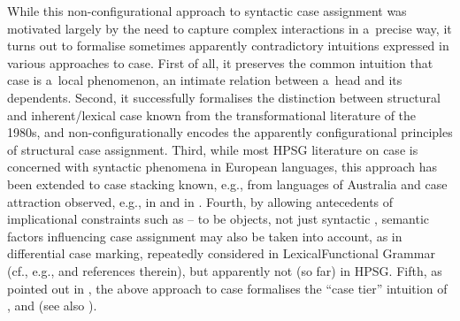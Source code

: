 \documentclass[output=paper,biblatex,babelshorthands,newtxmath,draftmode,colorlinks,citecolor=brown]{langscibook}
\begin{document}
While this non-configurational approach to syntactic case assignment was motivated largely by the need to capture complex interactions in a~precise way, it turns out to formalise sometimes apparently contradictory intuitions expressed in various approaches to case.  First of all, it preserves the common intuition that case is a~local phenomenon, an intimate relation between a~head and its dependents.  Second, it successfully formalises the distinction between structural and inherent/lexical case known from the transformational literature of the 1980s, and non-configurationally encodes the apparently configurational principles of structural case assignment.  Third, while most HPSG literature on case is concerned with syntactic phenomena in European languages, this approach has been extended to case stacking known, e.g., from languages of Australia and case attraction observed, e.g., in  and in  \citep{malo:00}.  Fourth, by allowing antecedents of implicational constraints such as – to be  objects, not just syntactic , semantic factors influencing case assignment may also be taken into account, as in differential case marking, repeatedly considered in Lexical\indexlfgstart Functional Grammar (cf., e.g., \citealt{BHK2003a-u} and references therein), but apparently not (so far) in HPSG\@.  Fifth, as pointed out in \citet{Prze99b,Prze99}, the above approach to case formalises the ``case tier'' intuition of \citet{ZMT85a}, \citet{YMJ87} and \citet{mali:93} (see also \citealt{mali:09}).
\end{document}
